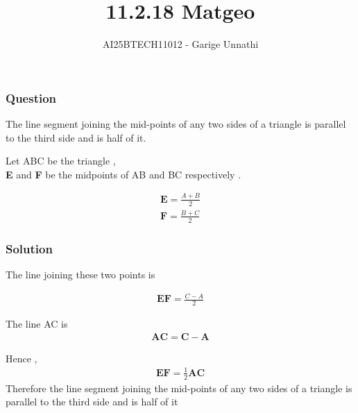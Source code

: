 \documentclass{beamer}
\title{11.2.18 Matgeo}
\author{AI25BTECH11012 - Garige Unnathi}
\date{}
\begin{document}
\frame{\titlepage}

\begin{frame}
\frametitle{Question}
The line segment joining the mid-points of any two sides of a triangle is parallel to
the third side and is half of it.
\end{frame}


\begin{frame}
Let ABC be the triangle ,\\
\textbf{E }and \textbf{F} be the midpoints of AB and BC respectively .


\begin{align}
  \textbf{E}  = \frac{A + B}{2}\\
  \textbf{F}  = \frac{B + C}{2}
\end{align}
\end{frame}


\begin{frame}
\frametitle{Solution}
The line joining these two points is  


\begin{align}
 \textbf{EF}=  \frac{C - A}{2}
\end{align}

The line AC is
\begin{align}
\textbf{AC} = \textbf{C} - \textbf{A}
\end{align}

\end{frame}


\begin{frame}
Hence ,
\begin{align}
    \textbf{EF} = \frac{1}{2}\textbf{AC}
\end{align}
Therefore the line segment joining the mid-points of any two sides of a triangle is parallel to
the third side and is half of it

\end{frame}
\end{document}
